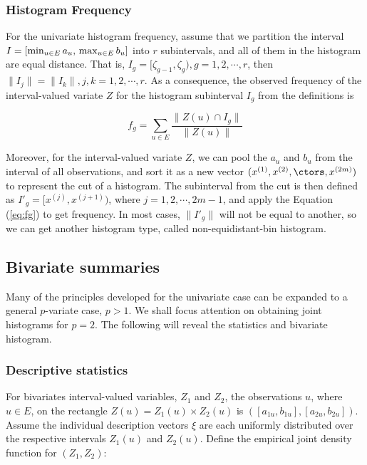 \documentclass[article]{jss}
\begin{document}
\subsubsection{Histogram Frequency}\label{sec:hist}

For the univariate histogram frequency, assume that we partition the interval $I=[\min_{u \in E} a_u,\\ \max_{u \in E} b_u]$ into $r$ subintervals, and all of them in the histogram are equal distance. That is, $I_g = [\zeta_{g-1},\zeta_{g}),g=1,2,\cdots,r$, then $\| I_j \| = \| I_k \| , j,k=1,2,\cdots,r$. As a consequence, the observed frequency of the interval-valued variate $Z$ for the histogram subinterval $I_g$ from the definitions is

\begin{equation}\label{eq:fg}
f_g = \sum_{u \in E}\frac{\| Z(u) \cap I_g \|}{\| Z(u) \|}
\end{equation}

Moreover, for the interval-valued variate $Z$, we can pool the $a_u$ and $b_u$ from the interval of all observations, and sort it as a new vector $(x^{(1)},x^{(2)},\ctors,x^{(2m)})$ to represent the cut of a histogram. The subinterval from the cut is then defined as $I'_g = [x^{(j)},x^{(j+1)})$, where $j = 1,2,\cdots, 2m-1$, and apply the Equation (\ref{eq:fg}) to get frequency. In most cases, $\| I'_g \|$ will not be equal to another, so we can get another histogram type, called non-equidistant-bin histogram.


\subsection{Bivariate summaries}

Many of the principles developed for the univariate case can be expanded to a general $p$-variate case, $p > 1$. We shall focus attention on obtaining joint histograms for $p = 2$. The following will reveal the statistics and bivariate histogram.

\subsubsection{Descriptive statistics}

For bivariates interval-valued variables, $Z_1$ and $Z_2$, the observations $u$, where $u \in E$, on the rectangle $Z(u) = Z_1(u) \times Z_2(u)$ is $([a_{1u}, b_{1u}], [a_{2u}, b_{2u}])$. Assume the individual description vectors $\xi$ are each uniformly distributed over the respective intervals $Z_1(u)$ and $Z_2(u)$.  Define the empirical joint density function for $(Z_1, Z_2)$:
\end{document}
